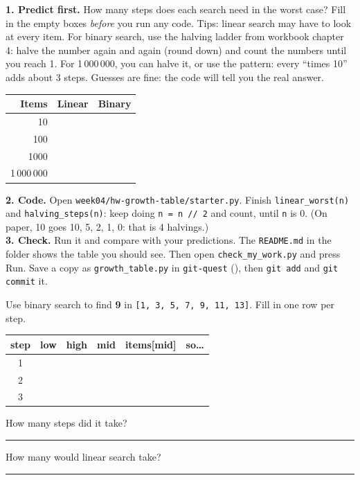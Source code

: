 \namedateline

\begin{core}
\textbf{1. Predict first.} How many steps does each search need in the worst case? Fill in the empty boxes \emph{before} you run any code.
Tips: linear search may have to look at every item. For binary search, use the halving ladder from workbook chapter 4: halve the number again and again (round down) and count the numbers until you reach 1. For 1\,000\,000, you can halve it, or use the pattern: every \enquote{times 10} adds about 3 steps. Guesses are fine: the code will tell you the real answer.
\begin{center}
\renewcommand{\arraystretch}{1.4}
\begin{tabular}{|r|p{3cm}|p{3cm}|}
\hline
\textbf{Items} & \textbf{Linear} & \textbf{Binary} \\ \hline
10 & & \\ \hline
100 & & \\ \hline
1000 & & \\ \hline
1\,000\,000 & & \\ \hline
\end{tabular}
\end{center}
\textbf{2. Code.} Open \texttt{week04/hw-growth-table/starter.py}. Finish \texttt{linear\_worst(n)} and \texttt{halving\_steps(n)}: keep doing \texttt{n = n // 2} and count, until \texttt{n} is 0. (On paper, 10 goes 10, 5, 2, 1, 0: that is 4 halvings.)\\
\textbf{3. Check.} Run it and compare with your predictions. The \texttt{README.md} in the folder shows the table you should see. Then open \texttt{check\_my\_work.py} and press Run. Save a copy as \texttt{growth\_table.py} in \texttt{git-quest} (), then \texttt{git add} and \texttt{git commit} it.
\end{core}

\begin{challenge}
Use binary search to find \textbf{9} in \texttt{[1, 3, 5, 7, 9, 11, 13]}. Fill in one row per step.
\begin{center}
\renewcommand{\arraystretch}{1.4}
\begin{tabular}{|c|c|c|c|c|p{4cm}|}
\hline
\textbf{step} & \textbf{low} & \textbf{high} & \textbf{mid} & \textbf{items[mid]} & \textbf{so\ldots} \\ \hline
1 & & & & & \\ \hline
2 & & & & & \\ \hline
3 & & & & & \\ \hline
\end{tabular}
\end{center}
How many steps did it take? \rule{1.5cm}{0.4pt}\quad How many would linear search take? \rule{1.5cm}{0.4pt}
\end{challenge}

